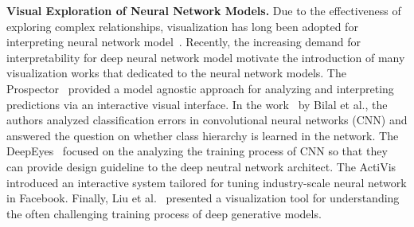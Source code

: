 \textbf{Visual Exploration of Neural Network Models.}
Due to the effectiveness of exploring complex relationships, visualization has long been adopted for interpreting neural network model~\cite{TzengMa2005}.
Recently, the increasing demand for interpretability for deep neural network model motivate the introduction of many visualization works that dedicated to the neural network models.
The Prospector~\cite{KrausePererNg2016} provided a model agnostic approach for analyzing and interpreting predictions via an interactive visual interface.
%
In the work~\cite{BilalJourablooYe2018} by Bilal et al., the authors analyzed classification errors in convolutional neural networks (CNN) and answered the question on whether class hierarchy is learned in the network.
%
The DeepEyes~\cite{Pezzotti2018} focused on the analyzing the training process of CNN so that they can provide design guideline to the deep neutral network architect.
%
The ActiVis~\cite{KahngAndrewsKalro2018} introduced an interactive system tailored for tuning industry-scale neural network in Facebook.
Finally, Liu et al.~\cite{LiuShiCao2018} presented a visualization tool for understanding the often challenging training process of deep generative models.


